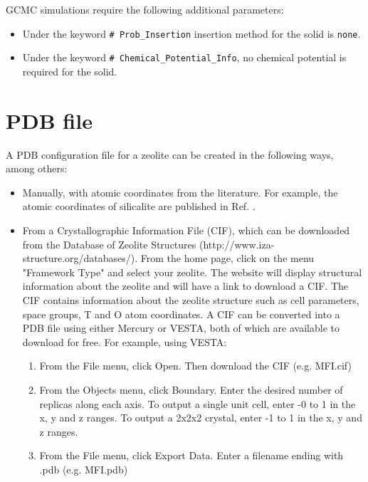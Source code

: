 GCMC simulations require the following additional parameters:

\begin{itemize}
	\item Under the keyword \texttt{\# Prob\_Insertion} insertion method for the solid is \texttt{none}.
	\item Under the keyword \texttt{\# Chemical\_Potential\_Info}, no chemical potential is required for the solid.
\end{itemize}

\section{PDB file}\label{sec:solid_pdb}
A PDB configuration file for a zeolite can be created in the following ways, among others: 

\begin{itemize}
	\item Manually, with atomic coordinates from the literature. 
	For example, the atomic coordinates of silicalite are published in Ref. \cite{Meier:1981}.

	\item From a Crystallographic Information File (CIF), which can be downloaded from
	the Database of Zeolite Structures (http://www.iza-structure.org/databases/).
	From the home page, click on the menu "Framework Type" and select your zeolite. 
	The website will display structural information about the zeolite and will have 
	a link to download a CIF. The CIF contains information about the 
	zeolite structure such as cell parameters, space groups, T and O atom coordinates. 
	A CIF can be converted into a PDB file using either Mercury or VESTA, both of which
	are available to download for free.
	For example, using VESTA:

	\begin{enumerate}
		\item From the File menu, click Open. Then download the CIF (e.g. MFI.cif)

		\item From the Objects menu, click Boundary. Enter the desired number of replicas
		along each axis. To output a single unit cell, enter -0 to 1 in the x, y and z ranges. 
		To output a 2x2x2 crystal, enter -1 to 1 in the x, y and z ranges. 

		\item From the File menu, click Export Data. Enter a filename ending with .pdb (e.g. MFI.pdb)
	\end{enumerate}

\end{itemize}

